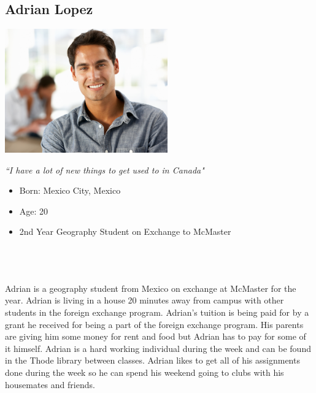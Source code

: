 \documentclass[10pt]{article}
\begin{document}

\subsection*{Adrian Lopez}
\vspace{4mm}

\begin{minipage}{70mm}
\includegraphics[width=70mm]{Adrian.png}
\begin{center}
\emph{``I have a lot of new things to get used to in Canada"}
\end{center}
\end{minipage}\hfill
\begin{minipage}{\textwidth}
\begin{itemize}
\item Born: Mexico City, Mexico
\item Age: 20
\item 2nd Year Geography Student on Exchange to McMaster
\end{itemize}
\end{minipage}\\\\\\

Adrian is a geography student from Mexico on exchange at McMaster for the year. Adrian is living in a house 20 minutes away from campus with other students in the foreign exchange program. Adrian's tuition is being paid for by a grant he received for being a part of the foreign exchange program. His parents are giving him some money for rent and food but Adrian has to pay for some of it himself. Adrian is a hard working individual during the week and can be found in the Thode library between classes. Adrian likes to get all of his assignments done during the week so he can spend his weekend going to clubs with his housemates and friends.\\
\end{document}
